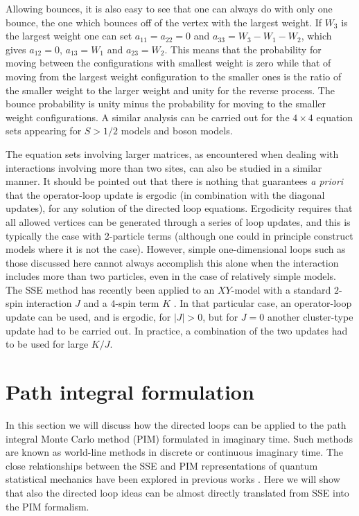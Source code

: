 \documentclass[10pt,pre,aps,twocolumn,showpacs,superscriptaddress,
floatfix]{revtex4}
\begin{document}
Allowing bounces, it is also easy to see that one can always do with only one
bounce, the one which bounces off of the vertex with the largest weight.
If $W_3$ is the largest weight one can set $a_{11}=a_{22}=0$ and 
$a_{33} = W_3-W_1-W_2$, which gives $a_{12}=0$, $a_{13}=W_1$ and $a_{23}=W_2$.
This means that the probability for moving between the configurations with
smallest weight is zero while that of moving from the largest weight
configuration to the smaller ones is the ratio of the smaller weight to the
larger weight and unity for the reverse process. The bounce probability is
unity minus the probability for moving to the smaller weight configurations.
A similar analysis can be carried out for the $4\times 4$ equation sets
appearing for $S>1/2$ models and boson models.

The equation sets involving larger matrices, as encountered when dealing with
interactions involving more than two sites, can also be studied in a similar 
manner. It should be pointed out that there is nothing that guarantees
{\it a priori} that the operator-loop update is ergodic (in combination
with the diagonal updates), for any solution of the directed loop equations. 
Ergodicity requires that all allowed vertices can be generated through a 
series of loop updates, and this is typically the case with 2-particle terms 
(although one could in principle construct models where it is not the case). 
However, simple one-dimensional loops such as those discussed here cannot 
always accomplish this alone when the interaction includes more than two 
particles, even in the case of relatively simple models. The SSE method has 
recently been applied to an $XY$-model with a standard $2$-spin interaction 
$J$ and a $4$-spin term $K$ \cite{jkmodel}. In that particular case, an 
operator-loop update can be used, and is ergodic, for $|J| > 0$, but for $J=0$ 
another cluster-type update had to be carried out. In practice, a combination
of the two updates had to be used for large $K/J$.

\section{Path integral formulation \label{PIMsection}}

In this section we will discuss how the directed loops can be applied to 
the path integral Monte Carlo method (PIM) formulated in imaginary time. 
Such methods are known as world-line methods in discrete \cite{worldline} 
or continuous \cite{prokofev,beard} imaginary time. The close relationships 
between the SSE and PIM representations of quantum statistical mechanics 
have been explored in previous works \cite{irsse,athens}. Here we will show 
that also the directed loop ideas can be almost directly translated 
from SSE into the PIM formalism.
\end{document}
